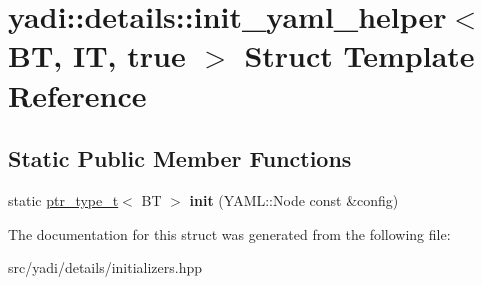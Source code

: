 \hypertarget{structyadi_1_1details_1_1init__yaml__helper_3_01_b_t_00_01_i_t_00_01true_01_4}{}\section{yadi\+:\+:details\+:\+:init\+\_\+yaml\+\_\+helper$<$ BT, IT, true $>$ Struct Template Reference}
\label{structyadi_1_1details_1_1init__yaml__helper_3_01_b_t_00_01_i_t_00_01true_01_4}
\subsection*{Static Public Member Functions}
\begin{DoxyCompactItemize}
\item 
\mbox{\label{structyadi_1_1details_1_1init__yaml__helper_3_01_b_t_00_01_i_t_00_01true_01_4_a7070e4a34e5dea1bd2388e45f67430c9}} 
static \hyperlink{namespaceyadi_a92290eb27cd90666aa87b17d854af9fe}{ptr\+\_\+type\+\_\+t}$<$ BT $>$ {\bfseries init} (Y\+A\+M\+L\+::\+Node const \&config)
\end{DoxyCompactItemize}


The documentation for this struct was generated from the following file\+:\begin{DoxyCompactItemize}
\item 
src/yadi/details/initializers.\+hpp\end{DoxyCompactItemize}
